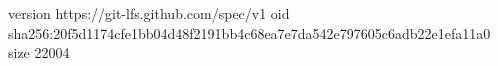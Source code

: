version https://git-lfs.github.com/spec/v1
oid sha256:20f5d1174cfe1bb04d48f2191bb4c68ea7e7da542e797605c6adb22e1efa11a0
size 22004
